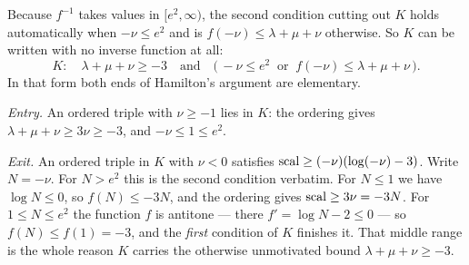 \begin{lemma}
  \label{lem:ivey-set}
  \leanok
  Because $f^{-1}$ takes values in $[e^2,\infty)$, the second condition cutting out $K$ holds
  automatically when $-\nu \le e^2$ and is $f(-\nu) \le \lambda+\mu+\nu$ otherwise. So $K$ can
  be written with no inverse function at all:
  \[
    K : \quad \lambda+\mu+\nu \ge -3
    \quad\text{and}\quad
    \bigl(\, -\nu \le e^2 \ \text{ or } \ f(-\nu) \le \lambda+\mu+\nu \,\bigr).
  \]
  In that form both ends of Hamilton's argument are elementary.

  \emph{Entry.} An ordered triple with $\nu \ge -1$ lies in $K$: the ordering gives
  $\lambda+\mu+\nu \ge 3\nu \ge -3$, and $-\nu \le 1 \le e^2$.

  \emph{Exit.} An ordered triple in $K$ with $\nu < 0$ satisfies
  $\operatorname{scal} \ge (-\nu)(\log(-\nu) - 3)$. Write $N = -\nu$. For $N > e^2$ this is the second
  condition verbatim. For $N \le 1$ we have $\log N \le 0$, so $f(N) \le -3N$, and the ordering
  gives $\operatorname{scal} \ge 3\nu = -3N$. For $1 \le N \le e^2$ the function $f$ is antitone --- there
  $f' = \log N - 2 \le 0$ --- so $f(N) \le f(1) = -3$, and the \emph{first} condition of $K$
  finishes it. That middle range is the whole reason $K$ carries the otherwise unmotivated
  bound $\lambda+\mu+\nu \ge -3$.
\end{lemma}

